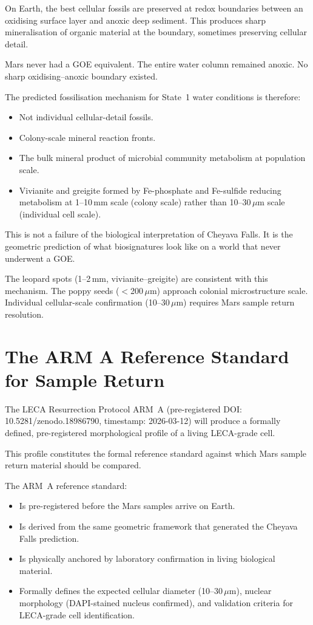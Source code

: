 \documentclass[11pt, a4paper]{article}
\begin{document}
On Earth, the best cellular fossils are preserved
at redox boundaries between an oxidising surface
layer and anoxic deep sediment.
This produces sharp mineralisation of organic
material at the boundary, sometimes preserving
cellular detail.

Mars never had a GOE equivalent.
The entire water column remained anoxic.
No sharp oxidising--anoxic boundary existed.

The predicted fossilisation mechanism for
State~1 water conditions is therefore:

\begin{itemize}[leftmargin=*]
\item Not individual cellular-detail fossils.
\item Colony-scale mineral reaction fronts.
\item The bulk mineral product of microbial
  community metabolism at population scale.
\item Vivianite and greigite formed by
  Fe-phosphate and Fe-sulfide reducing metabolism
  at 1--10\,mm scale (colony scale) rather than
  10--30\,$\mu$m scale (individual cell scale).
\end{itemize}

This is not a failure of the biological interpretation
of Cheyava Falls.
It is the geometric prediction of what biosignatures
look like on a world that never underwent a GOE.

The leopard spots (1--2\,mm, vivianite--greigite)
are consistent with this mechanism.
The poppy seeds ($<$200\,$\mu$m) approach colonial
microstructure scale.
Individual cellular-scale confirmation (10--30\,$\mu$m)
requires Mars sample return resolution.

\section{The ARM A Reference Standard for Sample
Return}

The LECA Resurrection Protocol ARM~A
(pre-registered DOI: 10.5281/zenodo.18986790,
timestamp: 2026-03-12) will produce a formally
defined, pre-registered morphological profile of
a living LECA-grade cell.

This profile constitutes the formal reference
standard against which Mars sample return material
should be compared.

The ARM~A reference standard:
\begin{itemize}[leftmargin=*]
\item Is pre-registered before the Mars samples
  arrive on Earth.
\item Is derived from the same geometric framework
  that generated the Cheyava Falls prediction.
\item Is physically anchored by laboratory
  confirmation in living biological material.
\item Formally defines the expected cellular
  diameter (10--30\,$\mu$m), nuclear morphology
  (DAPI-stained nucleus confirmed), and validation
  criteria for LECA-grade cell identification.
\end{itemize}
\end{document}
